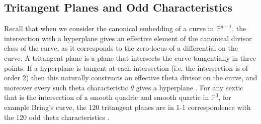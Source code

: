 \documentclass{amsart}
\begin{document}
\subsection{Tritangent Planes and Odd Characteristics}\label{subsec: tritangent planes}
Recall that when we consider the canonical embedding of a curve in $\mathbb{P}^{g-1}$, the intersection with a hyperplane gives an effective element of the canonical divisor class of the curve, as it corresponds to the zero-locus of a differential on the curve. A tritangent plane is a plane that intersects the curve tangentially in three points. If a hyperplane is tangent at each intersection (i.e. the intersection is of order 2) then this naturally constructs an effective theta divisor on the curve, and moreover every such theta characteristic $\theta$ gives a hyperplane \cite{Celik2019}. For any sextic that is the intersection of a smooth quadric and smooth quartic in $\mathbb{P}^3$, for example Bring's curve, the 120 tritangent planes are in 1-1 correspondence with the 120 odd theta characteristics \cite[Theorem 2.2]{Harris2017}. 
\end{document}
